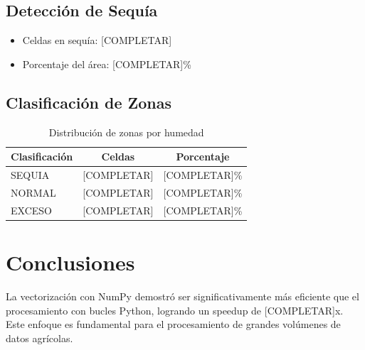\documentclass[11pt,a4paper]{article}
\begin{document}
\subsection{Detección de Sequía}


\begin{itemize}
    \item Celdas en sequía: [COMPLETAR]
    \item Porcentaje del área: [COMPLETAR]\%
\end{itemize}

\subsection{Clasificación de Zonas}


\begin{table}[h]
\centering
\begin{tabular}{lcc}
\toprule
Clasificación & Celdas & Porcentaje \\
\midrule
SEQUIA & [COMPLETAR] & [COMPLETAR]\% \\
NORMAL & [COMPLETAR] & [COMPLETAR]\% \\
EXCESO & [COMPLETAR] & [COMPLETAR]\% \\
\bottomrule
\end{tabular}
\caption{Distribución de zonas por humedad}
\end{table}

\section{Conclusiones}

La vectorización con NumPy demostró ser significativamente más eficiente que el procesamiento con bucles Python, logrando un speedup de [COMPLETAR]x. Este enfoque es fundamental para el procesamiento de grandes volúmenes de datos agrícolas.
\end{document}
